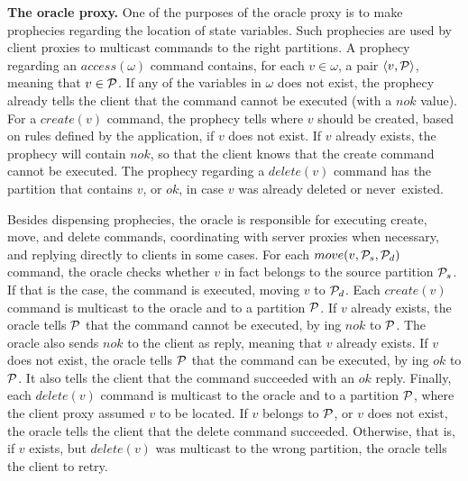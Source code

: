 \textbf{The oracle proxy.} One of the purposes of the oracle proxy is to make
prophecies regarding the location of state variables. Such prophecies are used
by client proxies to multicast commands to the right partitions. A prophecy
regarding an $access(\omega)$ command contains, for each $v \in \omega$, a pair
$\langle v, \mathcal{P} \rangle$, meaning that $v \in \mathcal{P}$. If any of the variables in
$\omega$ does not exist, the prophecy already tells the client that the command
cannot be executed (with a $nok$ value). For a $create(v)$ command, the prophecy
tells where $v$ should be created, based on rules defined by the application, if
$v$ does not exist. If $v$ already exists, the prophecy will contain $nok$, so
that the client knows that the create command cannot be executed. The prophecy
regarding a $delete(v)$ command has the partition that contains $v$, or
$ok$, in case $v$ was already deleted or never~existed.

Besides dispensing prophecies, the oracle is responsible for executing create,
move, and delete commands, coordinating with server proxies when necessary, and
replying directly to clients in some cases. For each $move(v,\mathcal{P}_s,\mathcal{P}_d)$
command, the oracle checks whether $v$ in fact belongs to the source partition
$\mathcal{P}_s$. If that is the case, the command is executed, moving $v$ to $\mathcal{P}_d$.
Each $create(v)$ command is multicast to the oracle and to a partition $\mathcal{P}$.
If $v$ already exists, the oracle tells $\mathcal{P}$ that the command cannot be
executed, by \rmcast{}ing $nok$ to $\mathcal{P}$. The oracle also sends $nok$ to the
client as reply, meaning that $v$ already exists. If $v$ does not exist, the
oracle tells $\mathcal{P}$ that the command can be executed, by \rmcast{}ing $ok$ to
$\mathcal{P}$. It also tells the client that the command succeeded with an $ok$ reply.
Finally, each $delete(v)$ command is multicast to the oracle and to a partition
$\mathcal{P}$, where the client proxy assumed $v$ to be located. If $v$ belongs to
$\mathcal{P}$, or $v$ does not exist, the oracle tells the client that the delete
command succeeded. Otherwise, that is, if $v$ exists, but $delete(v)$ was
multicast to the wrong partition, the oracle tells the client to retry.


